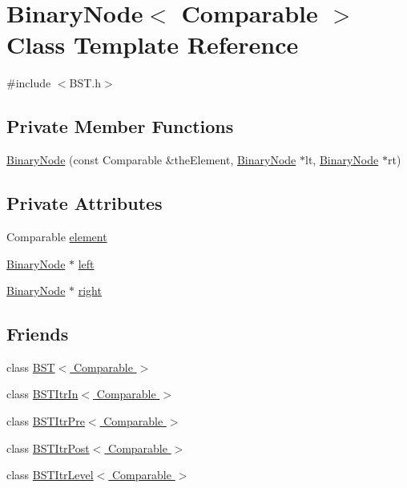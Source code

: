 \hypertarget{class_binary_node}{}\section{Binary\+Node$<$ Comparable $>$ Class Template Reference}
\label{class_binary_node}


{\ttfamily \#include $<$B\+S\+T.\+h$>$}

\subsection*{Private Member Functions}
\begin{DoxyCompactItemize}
\item 
\hyperlink{class_binary_node_aff89d3679c077d70b67ad16e9816d884}{Binary\+Node} (const Comparable \&the\+Element, \hyperlink{class_binary_node}{Binary\+Node} $\ast$lt, \hyperlink{class_binary_node}{Binary\+Node} $\ast$rt)
\end{DoxyCompactItemize}
\subsection*{Private Attributes}
\begin{DoxyCompactItemize}
\item 
Comparable \hyperlink{class_binary_node_a75804c1624577ae485b775408b54bd06}{element}
\item 
\hyperlink{class_binary_node}{Binary\+Node} $\ast$ \hyperlink{class_binary_node_a2b6352b5519f90f2d9c2d610b2278dac}{left}
\item 
\hyperlink{class_binary_node}{Binary\+Node} $\ast$ \hyperlink{class_binary_node_a847342c242923f34b77fc5e402fbbb4b}{right}
\end{DoxyCompactItemize}
\subsection*{Friends}
\begin{DoxyCompactItemize}
\item 
class \hyperlink{class_binary_node_a28a1adb9906f3ff7e12c2cb6fa2bd54e}{B\+S\+T$<$ Comparable $>$}
\item 
class \hyperlink{class_binary_node_aab3993acac2ab24a0b59edb0c3acc775}{B\+S\+T\+Itr\+In$<$ Comparable $>$}
\item 
class \hyperlink{class_binary_node_a45a55df6f11541416d4ea7684c575c1a}{B\+S\+T\+Itr\+Pre$<$ Comparable $>$}
\item 
class \hyperlink{class_binary_node_a5dc153694be266f6e772659486219da7}{B\+S\+T\+Itr\+Post$<$ Comparable $>$}
\item 
class \hyperlink{class_binary_node_a26ff00bc0d87069aed877f10fd3c80a8}{B\+S\+T\+Itr\+Level$<$ Comparable $>$}
\end{DoxyCompactItemize}


